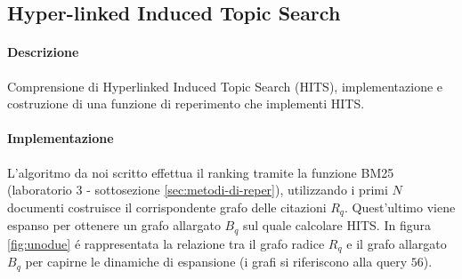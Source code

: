 \subsection{Hyper-linked Induced Topic Search}
\label{sec:hits}

\paragraph{\textbf{Descrizione}}
Comprensione di Hyperlinked Induced Topic Search (\textsc{HITS}), implementazione e costruzione di una funzione di reperimento che implementi \textsc{HITS}.

\paragraph{\textbf{Implementazione}}
L'algoritmo da noi scritto effettua il ranking tramite la funzione \textsc{BM25} (laboratorio 3 - sottosezione \ref{sec:metodi-di-reper}), utilizzando i primi $N$ documenti costruisce il corrispondente grafo delle citazioni $R_q$. Quest'ultimo viene espanso per ottenere un grafo allargato $B_q$ sul quale calcolare \textsc{HITS}.
In figura \ref{fig:unodue} \'e rappresentata la relazione tra il grafo radice $R_q$ e il grafo allargato $B_q$ per capirne le dinamiche di espansione (i grafi si riferiscono alla query $56$).
